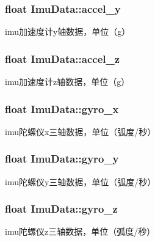 \subsubsection[{\texorpdfstring{accel\+\_\+y}{accel_y}}]{\setlength{\rightskip}{0pt plus 5cm}float Imu\+Data\+::accel\+\_\+y}\hypertarget{structImuData_abfc7185440169b8ef2571f9df60741b5}{}\label{structImuData_abfc7185440169b8ef2571f9df60741b5}
imu加速度计y轴数据，单位（g） 
\subsubsection[{\texorpdfstring{accel\+\_\+z}{accel_z}}]{\setlength{\rightskip}{0pt plus 5cm}float Imu\+Data\+::accel\+\_\+z}\hypertarget{structImuData_a0c86f254f9f528e174e9ea7779eb2e99}{}\label{structImuData_a0c86f254f9f528e174e9ea7779eb2e99}
imu加速度计z轴数据，单位（g） 
\subsubsection[{\texorpdfstring{gyro\+\_\+x}{gyro_x}}]{\setlength{\rightskip}{0pt plus 5cm}float Imu\+Data\+::gyro\+\_\+x}\hypertarget{structImuData_a7693a5307463d99e37530abc5f3ec8ec}{}\label{structImuData_a7693a5307463d99e37530abc5f3ec8ec}
imu陀螺仪x三轴数据，单位（弧度/秒） 
\subsubsection[{\texorpdfstring{gyro\+\_\+y}{gyro_y}}]{\setlength{\rightskip}{0pt plus 5cm}float Imu\+Data\+::gyro\+\_\+y}\hypertarget{structImuData_a9cb9ff8ceb19f95af9a2c1144d167067}{}\label{structImuData_a9cb9ff8ceb19f95af9a2c1144d167067}
imu陀螺仪y三轴数据，单位（弧度/秒） 
\subsubsection[{\texorpdfstring{gyro\+\_\+z}{gyro_z}}]{\setlength{\rightskip}{0pt plus 5cm}float Imu\+Data\+::gyro\+\_\+z}\hypertarget{structImuData_a1f5297d4e01240a47f0c4a8338a9df5f}{}\label{structImuData_a1f5297d4e01240a47f0c4a8338a9df5f}
imu陀螺仪z三轴数据，单位（弧度/秒） 
